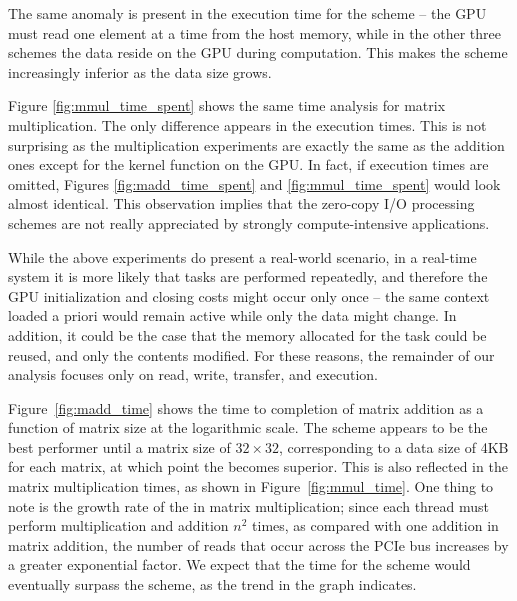 The same anomaly is present in the execution time for the {\hp} scheme
-- the GPU must read one element at a time from the host memory, while
in the other three schemes the data reside on the GPU during
computation.
This makes the {\hp} scheme increasingly inferior as the data size
grows.

Figure \ref{fig:mmul_time_spent} shows the same time analysis for matrix
multiplication.
The only difference appears in the execution times.
This is not surprising as the multiplication experiments are exactly the
same as the addition ones except for the kernel function on the GPU.
In fact, if execution times are omitted, Figures
\ref{fig:madd_time_spent} and \ref{fig:mmul_time_spent} would look
almost identical.
This observation implies that the zero-copy I/O processing schemes are
not really appreciated by strongly compute-intensive applications.

While the above experiments do present a real-world scenario, in a
real-time system it is more likely that tasks are performed repeatedly,
and therefore the GPU initialization and closing costs might occur only
once -- the same context loaded a priori would remain active while only
the data might change.
In addition, it could be the case that the memory allocated for the task
could be reused, and only the contents modified.
For these reasons, the remainder of our analysis focuses only on read,
write, transfer, and execution. 

Figure~\ref{fig:madd_time} shows the time to completion of matrix
addition as a function of matrix size at the logarithmic scale.
The {\hp} scheme appears to be the best performer until a matrix size of
$32\times32$, corresponding to a data size of 4KB for each matrix, at
which point the {\dmh} becomes superior.
This is also reflected in the matrix multiplication times, as shown in
Figure~\ref{fig:mmul_time}. 
One thing to note is the growth rate of the {\hp} in matrix
multiplication; since each thread must perform multiplication and
addition $n^2$ times, as compared with one addition in matrix addition,
the number of reads that occur across the PCIe bus increases by a
greater exponential factor.
We expect that the time for the {\hp} scheme would eventually surpass
the {\dm} scheme, as the trend in the graph indicates.


